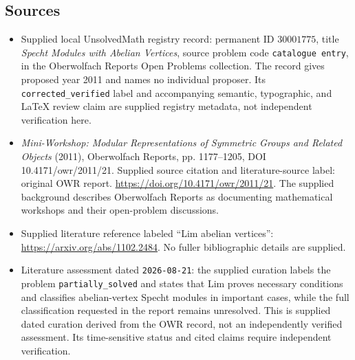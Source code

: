 \documentclass[11pt]{article}
\begin{document}
\subsection{Sources}
\begin{itemize}
\item Supplied local UnsolvedMath registry record: permanent ID \(30001775\), title \emph{Specht Modules with Abelian Vertices}, source problem code \texttt{catalogue entry}, in the Oberwolfach Reports Open Problems collection. The record gives proposed year 2011 and names no individual proposer. Its \texttt{corrected\_verified} label and accompanying semantic, typographic, and LaTeX review claim are supplied registry metadata, not independent verification here.
\item \emph{Mini-Workshop: Modular Representations of Symmetric Groups and Related Objects} (2011), Oberwolfach Reports, pp. 1177--1205, DOI 10.4171/owr/2011/21. Supplied source citation and literature-source label: original OWR report. \url{https://doi.org/10.4171/owr/2011/21}. The supplied background describes Oberwolfach Reports as documenting mathematical workshops and their open-problem discussions.
\item Supplied literature reference labeled ``Lim abelian vertices'': \url{https://arxiv.org/abs/1102.2484}. No fuller bibliographic details are supplied.
\item Literature assessment dated \texttt{2026-08-21}: the supplied curation labels the problem \texttt{partially\_solved} and states that Lim proves necessary conditions and classifies abelian-vertex Specht modules in important cases, while the full classification requested in the report remains unresolved. This is supplied dated curation derived from the OWR record, not an independently verified assessment. Its time-sensitive status and cited claims require independent verification.
\end{itemize}
\end{document}
